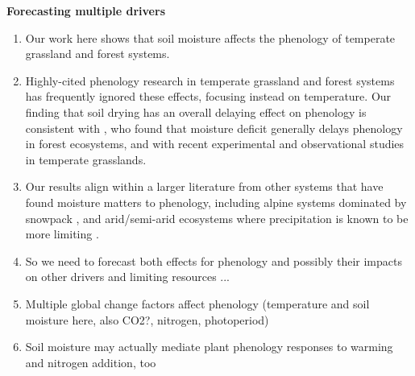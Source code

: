 \documentclass{article}
\begin{document}

\textbf {Forecasting multiple drivers }
\begin{enumerate}
\item Our work here shows that soil moisture affects the phenology of temperate grassland and forest systems.
\item Highly-cited phenology research in temperate grassland and forest systems has frequently ignored these effects, focusing instead on temperature. Our finding that soil drying has an overall delaying effect on phenology is consistent with \citet{seyed2018}, who found that moisture deficit generally delays phenology in forest ecosystems, and with recent experimental \citep{liu2022} and observational \citep{tao2020} studies in temperate grasslands. 
\item Our results align within a larger literature from other systems that have found moisture matters to phenology, including alpine systems dominated by snowpack \citep[e.g.,][]{dunne2004,sherwood2017}, and arid/semi-arid ecosystems where precipitation is known to be more limiting \citep{tao2019}. 
\item So we need to forecast both effects for phenology and possibly their impacts on other drivers and limiting resources ... 
\item Multiple global change factors affect phenology (temperature and soil moisture here, also CO2?, nitrogen, photoperiod)
 \item Soil moisture may actually mediate plant phenology responses to warming and nitrogen addition, too \citep{liu2022}
 \end{enumerate}
\end{document}
